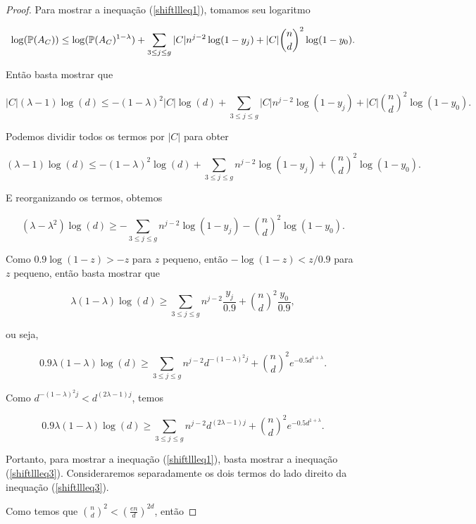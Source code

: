 \begin{proof}
Para mostrar a inequação (\ref{shiftllleq1}), tomamos seu logaritmo

\[\log(\mathbb{P}(A_C)) \leq \log(\mathbb{P}(A_C)^{1-\lambda}) + \sum\limits_{3\leq j\leq g}|C|n^{j-2}\log(1-y_j)+|C|\binom{n}{d}^2\log(1-y_0).\]

Então basta mostrar que

\[|C|(\lambda-1)\log(d) \leq -(1-\lambda)^2|C|\log(d) + \sum\limits_{3\leq j\leq g}|C|n^{j-2}\log(1-y_j)+|C|\binom{n}{d}^2\log(1-y_0).\]

Podemos dividir todos os termos por $|C|$ para obter

\[(\lambda-1)\log(d) \leq -(1-\lambda)^2\log(d) + \sum\limits_{3\leq j\leq g}n^{j-2}\log(1-y_j)+\binom{n}{d}^2\log(1-y_0).\]

E reorganizando os termos, obtemos

\[(\lambda-\lambda^2)\log(d) \geq -\sum\limits_{3\leq j\leq g}n^{j-2}\log(1-y_j)-\binom{n}{d}^2\log(1-y_0).\]

Como $0.9\log(1-z) > -z$ para $z$ pequeno, então $-\log(1-z)<z/0.9$ para $z$ pequeno, então basta mostrar que

\[\lambda(1-\lambda)\log(d) \geq \sum\limits_{3\leq j \leq g}n^{j-2}\frac{y_j}{0.9} + \binom{n}{d}^2\frac{y_0}{0.9},\]

ou seja,

\[0.9\lambda(1-\lambda)\log(d) \geq \sum\limits_{3\leq j \leq g}n^{j-2}d^{-(1-\lambda)^2j} +\binom{n}{d}^2e^{-0.5d^{1+\lambda}}.\]

Como $d^{-(1-\lambda)^2j} < d^{(2\lambda-1)j}$, temos

\begin{equation}\label{shiftllleq3}
0.9\lambda(1-\lambda)\log(d) \geq \sum\limits_{3\leq j \leq g}n^{j-2}d^{(2\lambda-1)j}+\binom{n}{d}^2e^{-0.5d^{1+\lambda}}.
\end{equation}

Portanto, para mostrar a inequação (\ref{shiftllleq1}), basta mostrar a inequação (\ref{shiftllleq3}). Consideraremos separadamente os dois termos do lado direito da inequação (\ref{shiftllleq3}).

Como temos que $\binom{n}{d}^2 < (\frac{en}{d})^{2d}$, então







\end{proof}
